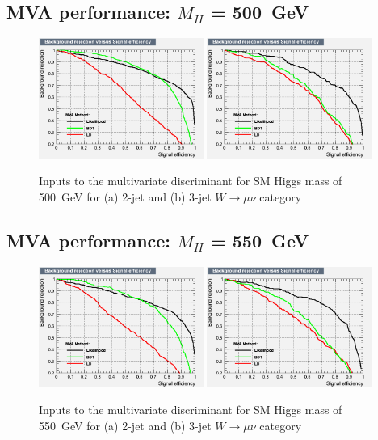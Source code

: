 \subsection{MVA performance: \texorpdfstring{$M_H$}{M(H)} = 500~GeV}
\begin{figure}[ht]
  \centering
  \includegraphics[width=0.48\textwidth]{figs/TMVA_500_nJ2_mu_rejBvsS}
  \includegraphics[width=0.48\textwidth]{figs/TMVA_500_nJ3_mu_rejBvsS}	
  \caption{\label{fig:perf500mu}Inputs to the multivariate discriminant for SM Higgs mass of 500~GeV for (a) 2-jet and (b) 3-jet $W\to\mu\nu$ category}
\end{figure}
\newpage
\subsection{MVA performance: \texorpdfstring{$M_H$}{M(H)} = 550~GeV}
\begin{figure}[ht]
  \centering
  \includegraphics[width=0.48\textwidth]{figs/TMVA_550_nJ2_mu_rejBvsS}
  \includegraphics[width=0.48\textwidth]{figs/TMVA_550_nJ3_mu_rejBvsS}	
  \caption{\label{fig:perf550mu}Inputs to the multivariate discriminant for SM Higgs mass of 550~GeV for (a) 2-jet and (b) 3-jet $W\to\mu\nu$ category}
\end{figure}
